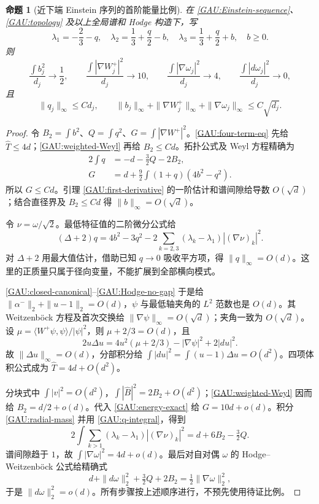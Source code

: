 \documentclass[UTF8,fontset=fandol,zihao=-4,oneside,openany]{ctexbook}
\theoremstyle{cjkplain}
\newtheorem{proposition}[theorem]{命题}
\numberwithin{equation}{chapter}
\begin{document}
\begin{proposition}[近下端 Einstein 序列的首阶能量比例]\label{GAU:ratios}
在 \eqref{GAU:Einstein-sequence}、\eqref{GAU:topology} 及以上全局谱和 Hodge 构造下，写
\[
\lambda_1=-\frac23-q,\quad
\lambda_2=\frac13+\frac q2-b,\quad
\lambda_3=\frac13+\frac q2+b,\quad b\ge0.
\]
则
\begin{equation}\label{GAU:ratios-eq}
\frac{\int b_j^2}{d_j}\to\frac12,\qquad
\frac{\int|\nabla W_j^+|^2}{d_j}\to10,\qquad
\frac{\int|\nabla\omega_j|^2}{d_j}\to4,\qquad
\frac{\int|d\omega_j|^2}{d_j}\to0,
\end{equation}
且
\begin{equation}\label{GAU:rates}
\|q_j\|_\infty\le Cd_j,\qquad
\|b_j\|_\infty+\|\nabla W_j^+\|_\infty+
\|\nabla\omega_j\|_\infty\le C\sqrt{d_j}.
\end{equation}
\end{proposition}
\begin{proof}
令 $B_2=\int b^2$、$Q=\int q^2$、$G=\int|\nabla W^+|^2$。\eqref{GAU:four-term-eq} 先给 $\widehat T\le4d$；\eqref{GAU:weighted-Weyl} 再给 $B_2\le Cd$。拓扑公式及 Weyl 方程精确为
\begin{align}
2\int q&=-d-\tfrac32Q-2B_2,\label{GAU:q-integral}\\
G&=d+\tfrac92\int(1+q)(4b^2-q^2).\label{GAU:energy-exact}
\end{align}
所以 $G\le Cd$。引理 \ref{GAU:first-derivative} 的一阶估计和谱间隙给导数 $O(\sqrt d)$；结合直径界及 $B_2\le Cd$ 得 $\|b\|_\infty=O(\sqrt d)$。

令 $\nu=\omega/\sqrt2$。最低特征值的二阶微分公式给
\begin{equation}\label{GAU:radial-mass}
(\Delta+2)q=4b^2-3q^2
-2\sum_{k=2,3}(\lambda_k-\lambda_1)| (\nabla\nu)_k|^2.
\end{equation}
对 $\Delta+2$ 用最大值估计，借助已知 $q\to0$ 吸收平方项，得 $\|q\|_\infty=O(d)$。这里的正质量只属于径向变量，不能扩展到全部横向模式。

\eqref{GAU:closed-canonical}--\eqref{GAU:Hodge-no-gap} 于是给 $\|\alpha^-\|_2+\|u-1\|_2=O(d)$，$\psi$ 与最低轴夹角的 $L^2$ 范数也是 $O(d)$。其 Weitzenböck 方程及首次交换给 $\|\nabla\psi\|_\infty=O(\sqrt d)$；夹角一致为 $O(\sqrt d)$。设 $\mu=\langle W^+\psi,\psi\rangle/|\psi|^2$，则 $\mu+2/3=O(d)$，且
\[
2u\Delta u=4u^2(\mu+2/3)-|\nabla\psi|^2+2|du|^2.
\]
故 $\|\Delta u\|_\infty=O(d)$，分部积分给
$\int|du|^2=\int(u-1)\Delta u=O(d^2)$。四项体积公式成为 $\widehat T=4d+O(d^2)$。

分块式中 $\int|v|^2=O(d^2)$，$\int|\widehat B|^2=2B_2+O(d^2)$；\eqref{GAU:weighted-Weyl} 因而给 $B_2=d/2+o(d)$。代入 \eqref{GAU:energy-exact} 给 $G=10d+o(d)$。积分 \eqref{GAU:radial-mass} 并用 \eqref{GAU:q-integral}，得到
\[
2\int\sum_{k>1}(\lambda_k-\lambda_1)| (\nabla\nu)_k|^2
=d+6B_2-\tfrac32Q.
\]
谱间隙趋于 $1$，故 $\int|\nabla\omega|^2=4d+o(d)$。最后对自对偶 $\omega$ 的 Hodge--Weitzenböck 公式给精确式
\begin{equation}\label{GAU:closure-exact}
d+\|d\omega\|_2^2+\tfrac32Q+2B_2
=\tfrac12\|\nabla\omega\|_2^2,
\end{equation}
于是 $\|d\omega\|_2^2=o(d)$。所有步骤按上述顺序进行，不预先使用待证比例。
\end{proof}
\end{document}
